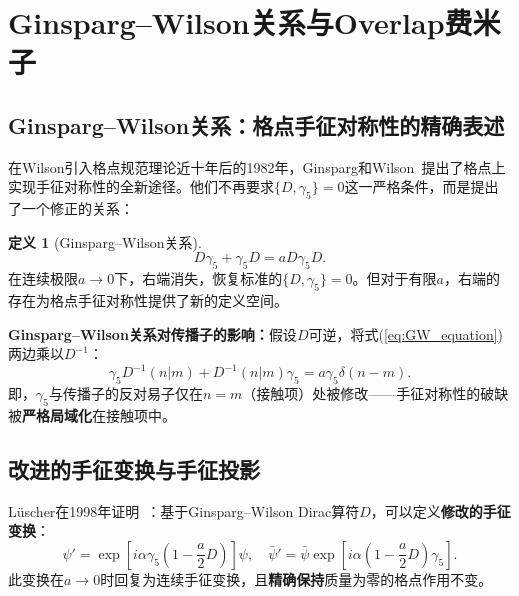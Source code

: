 \documentclass[12pt,a4paper]{ctexart}
\theoremstyle{definition}
\newtheorem{definition}{定义}[section]
\begin{document}
\section{Ginsparg--Wilson关系与Overlap费米子}

\subsection{Ginsparg--Wilson关系：格点手征对称性的精确表述}

在Wilson引入格点规范理论近十年后的1982年，Ginsparg和Wilson~\cite{GinspargWilson1982}提出了格点上实现手征对称性的全新途径。他们不再要求$\{D,\gamma_5\} = 0$这一严格条件，而是提出了一个修正的关系：

\begin{definition}[Ginsparg--Wilson关系]
\begin{equation}
\boxed{D\gamma_5 + \gamma_5 D = a D\gamma_5 D}.
\label{eq:GW_equation}
\end{equation}
在连续极限$a\to 0$下，右端消失，恢复标准的$\{D,\gamma_5\}=0$。但对于有限$a$，右端的存在为格点手征对称性提供了新的定义空间。
\end{definition}

\textbf{Ginsparg--Wilson关系对传播子的影响：}假设$D$可逆，将式(\ref{eq:GW_equation})两边乘以$D^{-1}$：
\begin{equation}
\gamma_5 D^{-1}(n|m) + D^{-1}(n|m)\gamma_5 = a\gamma_5\delta(n-m).
\label{eq:GW_propagator}
\end{equation}
即，$\gamma_5$与传播子的反对易子仅在$n=m$（接触项）处被修改——手征对称性的破缺被\textbf{严格局域化}在接触项中。

\subsection{改进的手征变换与手征投影}

L\"uscher在1998年证明~\cite{Luscher1998chiral}：基于Ginsparg--Wilson Dirac算符$D$，可以定义\textbf{修改的手征变换}：
\begin{equation}
\psi' = \exp\!\left[i\alpha\gamma_5\left(1-\frac{a}{2}D\right)\right]\psi, \quad
\bar\psi' = \bar\psi\exp\!\left[i\alpha\left(1-\frac{a}{2}D\right)\gamma_5\right].
\label{eq:lattice_chiral_trans}
\end{equation}
此变换在$a\to 0$时回复为连续手征变换，且\textbf{精确保持}质量为零的格点作用不变。
\end{document}
